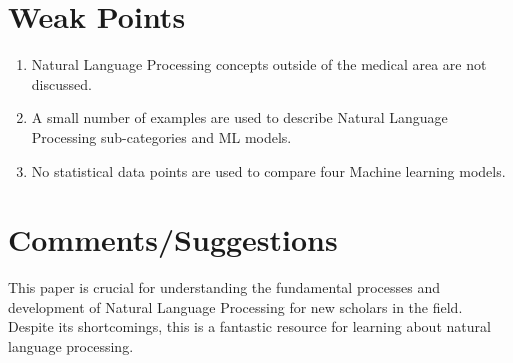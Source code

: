 \documentclass[a4paper,12pt]{article}
\begin{document}
\section*{Weak Points}

\begin{enumerate}
\item Natural Language Processing concepts outside of the medical area are not discussed.
\item A small number of examples are used to describe Natural Language Processing sub-categories and ML models.
\item No statistical data points are used to compare four Machine learning models.
\end{enumerate}

\section*{Comments/Suggestions}
This paper is crucial for understanding the fundamental processes and development of Natural Language Processing for new scholars in the field. Despite its shortcomings, this is a fantastic resource for learning about natural language processing.
\end{document}
